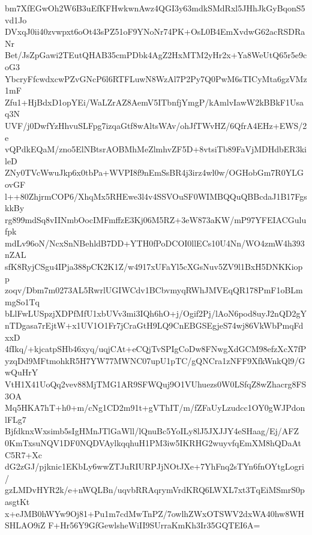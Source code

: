 bm7XfEGwOh2W6B3uEfKFHwkwnAwz4QGI3y63mdkSMdRxl5JHhJkGyBqonS5vd1Jo
DVxqJ0ii40zvwpxt6oOt43sPZ51oF9YNoNr74PK+OsL0B4EmXvdwG62acRSDRaNr
Bet/JsZpGawi2TEutQHAB35cmPDbk4AgZ2HxMTM2yHr2x+Ya8WeUtQ65r5e9coG3
YbcryFfcwdxcwPZvGNcP6l6RTFLuwN8WzAl7P2Py7Q0PwM6sTICyMta6gzVMz1mF
Zfu1+HjBdxD1opYEi/WaLZrAZ8AemV5ITbnfjYmgP/kAmlvIawW2kBBkF1Usaq3N
UVF/j0DwfYzHhvuSLFpg7izqaGtf8wAltsWAv/ohJfTWvHZ/6QfrA4EHz+EWS/2e
vQPdkEQaM/zno5ElNBtsrAOBMhMeZlmhvZF5D+8vtsiTb89FaVjMDHdbER3kileD
ZNy0TVcWwuJkp6x0tbPa+WVPI8f9nEmSsBR4j3irz4wl0w/OGHobGm7R0YLGovGF
l++80ZhjrmCOP6/XhqMx5RHEwe3l4v4SSVOuSF0WIMBQQuQBBcdaJ1B17FgskkBy
rg899mdSq8vIINmbOocIMFmffzE3Kj06M5RZ+3eW873aKW/mP97YFEIACGulufpk
mdLv96oN/NcxSnNBehldB7DD+YTH0fPoDCOI0llECs10U4Nn/WO4zmW4h393nZAL
sfK8RyjCSgu4IPja388pCK2K1Z/w4917xUFaYl5cXGsNuv5ZV9l1BxH5DNKKiopp
zoqv/Dbm7m0273AL5RwrlUGIWCdv1BCbvmyqRWhJMVEqQR178PmF1oBLmmgSo1Tq
bLlFwLUSpzjXDPfMfU1xbUVv3mi3IQh6hO+j/Ogif2Pj/lAoN6pod8uyJ2nQD2gY
nTDgasa7rEjtW+x1UV1O1Fr7jCraGtH9LQ9CnEBGSEgjeS74wj86VkWbPmqFdxxD
4fIkq/+kjcatpSHb46xyq/uqjCAt+eCQjTvSPIgCoDw8FNwgXdGCM98efzXcX7fP
yzqDd9MFtmohkR5H7YW77MWNC07upU1pTC/gQNCra1zNFF9XfkWnkQl9/GwQuHrY
VtH1X41UoQq2vev88MjTMG1AR9SFWQuj9O1VUhuezs0W0LSfqZ8wZhacrg8FS3OA
Mq5HKA7hT+h0+m/cNg1CD2m91t+gVThIT/m/fZFaUyLzudcc1OY0gWJPdonlFLg7
BjfdknxWxsimb5sIgHMnJTlGaWll/lQnuBc5YoILy8lJ5JXJJY4eSHaag/Ej/AFZ
0KmTxsuNQV1DF0NQDVAylkqqhuH1PM3iw5IKRHG2wuyvfqEmXM8hQDaAtC5R7+Xc
dG2zGJ/pjknic1EKbLy6wwZTJuRIURPJjNOtJXe+7YhFnq2sTYn6fnOYtgLogri/
gzLMDvHYR2k/e+nWQLBn/uqvbRRAqrymVrdKRQ6LWXL7xt3TqEiMSmrS0pasgtKt
x+eJMB0hWYw9Oj81+Pu1m7cdMwTnPZ/7owlhZWxOTSWV2dxWA40hw8WHSHLAO9iZ
F+Hr56Y9GfGewlsheWiII9SUrraKmKh3Ir35GQTEI6A=
